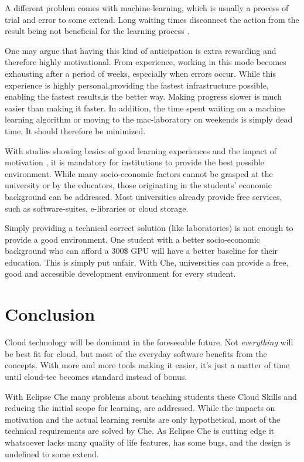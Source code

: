 \documentclass[utf8]{lni}
\begin{document}
A different problem comes with machine-learning, which is usually a process of trial and error to some extend.
Long waiting times disconnect the action from the result being not beneficial for the learning process \cite{HU95}\cite{DECI93}. 

One may argue that having this kind of anticipation is extra rewarding and therefore highly motivational.
From experience, working in this mode becomes exhausting after a period of weeks, especially when errors occur.
While this experience is highly personal,providing the 
fastest infrastructure possible, enabling the fastest results,is the better way.
Making  progress  slower  is much easier than making it faster. 
In addition, the time spent waiting on a machine learning algorithm or moving to the mac-laboratory on weekends is simply dead time. 
It should therefore be minimized.   

With studies showing basics of good learning experiences \cite{FI05}\cite{TC88} and the impact of motivation \cite{HU95}\cite{DECI93}, it is mandatory for institutions to provide the best possible environment. 
While many socio-economic factors cannot be grasped at the university or by the educators, those originating in the students' economic background can be addressed.
Most universities already provide free services, such as software-suites, e-libraries or cloud storage.

Simply providing a technical correct solution (like laboratories) is not enough to provide a good environment.
One student with a better socio-economic background who can afford a 300\$ GPU will have a better baseline for their education. 
This is simply put unfair.
With Che, universities can provide a free, good and accessible development environment for every student.
\section{Conclusion}
\label{sec:Conclusion}
Cloud technology will be dominant in the foreseeable future. 
Not \textit{everything} will be best fit for cloud, but most of the everyday software benefits from the concepts. 
With more and more tools making it easier, it's just a matter of time until cloud-tec becomes standard instead of bonus.

With Eclipse Che many problems about teaching students these Cloud Skills and reducing the initial scope for learning, are addressed. 
While the impacts on motivation and the actual learning results are only hypothetical, most of the technical requirements are solved by Che.  
As Eclipse Che is cutting edge it whatsoever lacks many quality of life features, has some bugs, and the design is undefined to some extend. 
\end{document}
